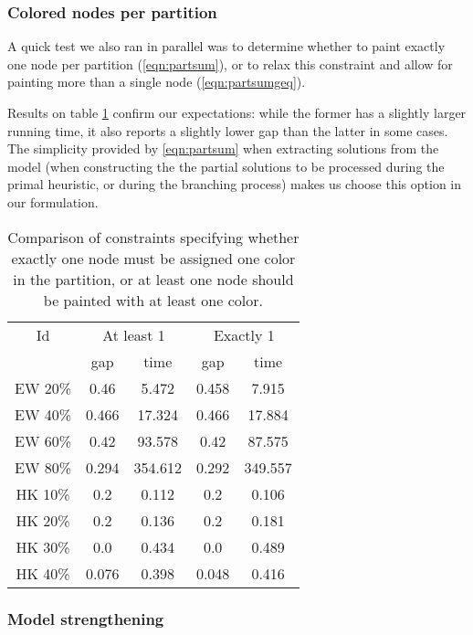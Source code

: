 \subsubsection*{Colored nodes per partition}

A quick test we also ran in parallel was to determine whether to paint exactly one node per partition (\ref{eqn:partsum}), or to relax this constraint and allow for painting more than a single node (\ref{eqn:partsumgeq}). 

Results on table \ref{table:models:partsum} confirm our expectations: while the former has a slightly larger running time, it also reports a slightly lower gap than the latter in some cases. The simplicity provided by \ref{eqn:partsum} when extracting solutions from the model (when constructing the the partial solutions to be processed during the primal heuristic, or during the branching process) makes us choose this option in our formulation.

\begin{table}
\label{table:models:partsum}
\centering

\begin{tabular}{|c|cc|cc|}
\hline
\multicolumn{1}{|c|}{Id} & \multicolumn{2}{|c|}{At least 1} & \multicolumn{2}{|c|}{Exactly 1}
\\
 & gap & time & gap & time
\\
\hline
EW 20\% & 0.46 & 5.472 & 0.458 & 7.915
\\
EW 40\% & 0.466 & 17.324 & 0.466 & 17.884
\\
EW 60\% & 0.42 & 93.578 & 0.42 & 87.575
\\
EW 80\% & 0.294 & 354.612 & 0.292 & 349.557
\\
\hline
HK 10\% &  0.2 & 0.112 &  0.2 & 0.106
\\
HK 20\% &  0.2 & 0.136 &  0.2 & 0.181
\\
HK 30\% &  0.0 & 0.434 &  0.0 & 0.489
\\
HK 40\% & 0.076 & 0.398 & 0.048 & 0.416
\\
\hline 
 \end{tabular}

\caption{Comparison of constraints specifying whether exactly one node must be assigned one color in the partition, or at least one node should be painted with at least one color.}

\end{table}

\subsubsection*{Model strengthening}

